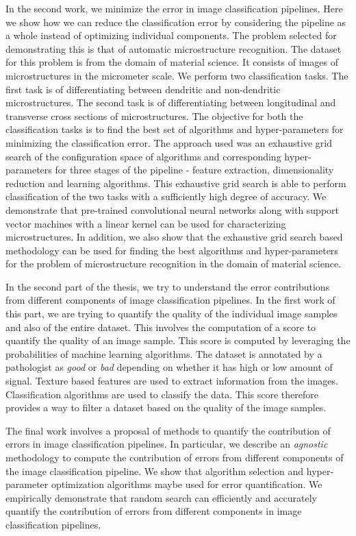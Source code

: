 In the second work, we minimize the error in image classification pipelines. Here we show how we can reduce the classification error by considering the pipeline as a whole instead of optimizing individual components. The problem selected for demonstrating this is that of automatic microstructure recognition. The dataset for this problem is from the domain of material science. It consists of images of microstructures in the micrometer scale. We perform two classification tasks. The first task is of differentiating between dendritic and non-dendritic microstructures. The second task is of differentiating between longitudinal and transverse cross sections of microstructures. The objective for both the classification tasks is to find the best set of algorithms and hyper-parameters for minimizing the classification error. The approach used was an exhaustive grid search of the configuration space of algorithms and corresponding hyper-parameters for three stages of the pipeline - feature extraction, dimensionality reduction and learning algorithms. This exhaustive grid search is able to perform classification of the two tasks with a sufficiently high degree of accuracy. We demonstrate that pre-trained convolutional neural networks along with support vector machines with a linear kernel can be used for characterizing microstructures. In addition, we also show that the exhaustive grid search based methodology can be used for finding the best algorithms and hyper-parameters for the problem of microstructure recognition in the domain of material science.

In the second part of the thesis, we try to understand the  error contributions from different components of  image classification pipelines. In the first work of this part, we are trying to quantify the quality of the individual image samples and also of the  entire dataset. This involves the computation of a score to quantify the quality of an image sample. This score is computed by leveraging the probabilities of machine learning algorithms. The dataset is annotated by a pathologist as \textit{good} or \textit{bad} depending on whether it has high or low amount of signal. Texture based features are used to extract information from the images. Classification algorithms are used to classify the data. This score therefore provides a way to filter a dataset based on the quality of the image samples.

The final work involves a proposal of methods to quantify the contribution of errors in image classification pipelines. In particular, we describe an \textit{agnostic} methodology to compute the contribution of errors from different components of the image classification pipeline.  We show that algorithm selection and hyper-parameter optimization algorithms maybe used for error quantification. We empirically demonstrate that random search can efficiently and accurately quantify the contribution of errors from different components  in image classification pipelines.


